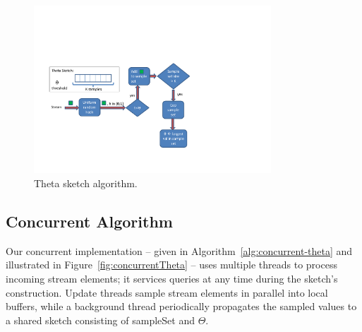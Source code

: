 \begin{figure}[tb]
    \includegraphics[width=3.5in]{images/seqTheta.pdf}
    \caption{Theta sketch algorithm.}
    \label{fig:thetaSampling}
\end{figure}





\subsection{Concurrent Algorithm}
\label{ssec:concurrent-theta}

Our concurrent implementation -- given in  Algorithm~\ref{alg:concurrent-theta} 
and illustrated in Figure~\ref{fig:concurrentTheta} --  
uses multiple threads to process incoming stream elements; 
it services queries at any time during the sketch's construction. 
Update threads sample stream elements in parallel into local buffers, 
while a background thread periodically propagates the sampled values to a shared sketch
consisting of sampleSet and $\Theta$. 


